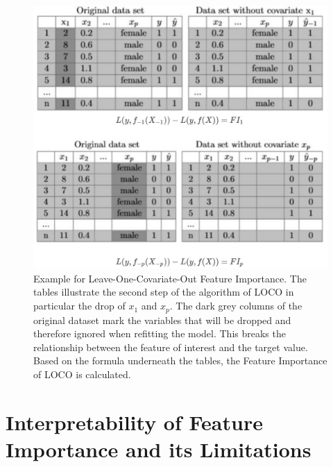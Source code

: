 \documentclass[]{krantz}
\begin{document}
\begin{figure}

{\centering \includegraphics[width=0.65\linewidth]{images/LOCO_All} 

}

\caption{Example for Leave-One-Covariate-Out Feature Importance. The tables illustrate the second step of the algorithm of LOCO in particular the drop of $x_{1}$ and $x_{p}$. The dark grey columns of the original dataset mark the variables that will be dropped and therefore ignored when refitting the model. This breaks the relationship between the feature of interest and the target value. Based on the formula underneath the tables, the Feature Importance of LOCO is calculated.}\label{fig:LOCO}
\end{figure}

\section{Interpretability of Feature Importance and its
Limitations}\label{interpretability-of-feature-importance-and-its-limitations}
\end{document}
